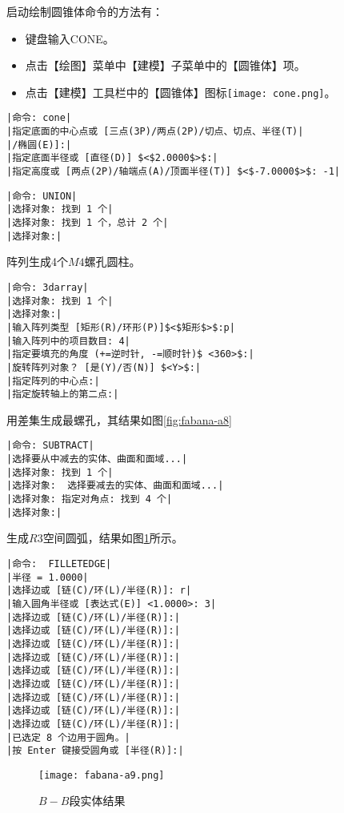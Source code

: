 \begin{procedure}
启动绘制圆锥体命令的方法有：
\begin{itemize}
\item 键盘输入CONE。
\item 点击【绘图】菜单中【建模】子菜单中的【圆锥体】项。
\item 点击【建模】工具栏中的【圆锥体】图标\texttt{[image: cone.png]}。
\end{itemize}
\begin{lstlisting}
|命令: cone|
|指定底面的中心点或 [三点(3P)/两点(2P)/切点、切点、半径(T)|
|/椭圆(E)]:|
|指定底面半径或 [直径(D)] $<$2.0000$>$:|
|指定高度或 [两点(2P)/轴端点(A)/顶面半径(T)] $<$-7.0000$>$: -1|
\end{lstlisting}
\begin{lstlisting}
|命令: UNION|
|选择对象: 找到 1 个|
|选择对象: 找到 1 个，总计 2 个|
|选择对象:|
\end{lstlisting}
\item 阵列生成4个$M4$螺孔圆柱。
\begin{lstlisting}
|命令: 3darray|
|选择对象: 找到 1 个|
|选择对象:|
|输入阵列类型 [矩形(R)/环形(P)]$<$矩形$>$:p|
|输入阵列中的项目数目: 4|
|指定要填充的角度 (+=逆时针, -=顺时针)$ <360>$:|
|旋转阵列对象？ [是(Y)/否(N)] $<Y>$:|
|指定阵列的中心点:|
|指定旋转轴上的第二点:|
\end{lstlisting}
\newpage
用差集生成最螺孔，其结果如图\ref{fig:fabana-a8}
\begin{lstlisting}
|命令: SUBTRACT|
|选择要从中减去的实体、曲面和面域...|
|选择对象: 找到 1 个|
|选择对象:  选择要减去的实体、曲面和面域...|
|选择对象: 指定对角点: 找到 4 个|
|选择对象:|
\end{lstlisting}
\item 生成$R3$空间圆弧，结果如图\ref{fig:fabana-a9}所示。
\begin{lstlisting}
|命令:  FILLETEDGE|
|半径 = 1.0000|
|选择边或 [链(C)/环(L)/半径(R)]: r|
|输入圆角半径或 [表达式(E)] <1.0000>: 3|
|选择边或 [链(C)/环(L)/半径(R)]:|
|选择边或 [链(C)/环(L)/半径(R)]:|
|选择边或 [链(C)/环(L)/半径(R)]:|
|选择边或 [链(C)/环(L)/半径(R)]:|
|选择边或 [链(C)/环(L)/半径(R)]:|
|选择边或 [链(C)/环(L)/半径(R)]:|
|选择边或 [链(C)/环(L)/半径(R)]:|
|选择边或 [链(C)/环(L)/半径(R)]:|
|选择边或 [链(C)/环(L)/半径(R)]:|
|已选定 8 个边用于圆角。|
|按 Enter 键接受圆角或 [半径(R)]:|
\end{lstlisting}
\begin{figure}[htbp]
\texttt{[image: fabana-a9.png]}
\caption{$B-B$段实体结果}\label{fig:fabana-a9}
\end{figure}
\end{procedure}
\endinput
